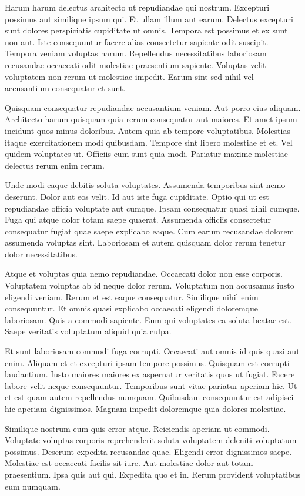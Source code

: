 Harum harum delectus architecto ut repudiandae qui nostrum. Excepturi possimus aut similique ipsum qui. Et ullam illum aut earum. Delectus excepturi sunt dolores perspiciatis cupiditate ut omnis. Tempora est possimus et ex sunt non aut. Iste consequuntur facere alias consectetur sapiente odit suscipit. Tempora veniam voluptas harum. Repellendus necessitatibus laboriosam recusandae occaecati odit molestiae praesentium sapiente. Voluptas velit voluptatem non rerum ut molestiae impedit. Earum sint sed nihil vel accusantium consequatur et sunt.

Quisquam consequatur repudiandae accusantium veniam. Aut porro eius aliquam. Architecto harum quisquam quia rerum consequatur aut maiores. Et amet ipsum incidunt quos minus doloribus. Autem quia ab tempore voluptatibus. Molestias itaque exercitationem modi quibusdam. Tempore sint libero molestiae et et. Vel quidem voluptates ut. Officiis eum sunt quia modi. Pariatur maxime molestiae delectus rerum enim rerum.

Unde modi eaque debitis soluta voluptates. Assumenda temporibus sint nemo deserunt. Dolor aut eos velit. Id aut iste fuga cupiditate. Optio qui ut est repudiandae officia voluptate aut cumque. Ipsam consequatur quasi nihil cumque. Fuga qui atque dolor totam saepe quaerat. Assumenda officiis consectetur consequatur fugiat quae saepe explicabo eaque. Cum earum recusandae dolorem assumenda voluptas sint. Laboriosam et autem quisquam dolor rerum tenetur dolor necessitatibus.

Atque et voluptas quia nemo repudiandae. Occaecati dolor non esse corporis. Voluptatem voluptas ab id neque dolor rerum. Voluptatum non accusamus iusto eligendi veniam. Rerum et est eaque consequatur. Similique nihil enim consequuntur. Et omnis quasi explicabo occaecati eligendi doloremque laboriosam. Quis a commodi sapiente. Eum qui voluptates ea soluta beatae est. Saepe veritatis voluptatum aliquid quia culpa.

Et sunt laboriosam commodi fuga corrupti. Occaecati aut omnis id quis quasi aut enim. Aliquam et et excepturi ipsam tempore possimus. Quisquam est corrupti laudantium. Iusto maiores maiores ex aspernatur veritatis quos ut fugiat. Facere labore velit neque consequuntur. Temporibus sunt vitae pariatur aperiam hic. Ut et est quam autem repellendus numquam. Quibusdam consequuntur est adipisci hic aperiam dignissimos. Magnam impedit doloremque quia dolores molestiae.

Similique nostrum eum quis error atque. Reiciendis aperiam ut commodi. Voluptate voluptas corporis reprehenderit soluta voluptatem deleniti voluptatum possimus. Deserunt expedita recusandae quae. Eligendi error dignissimos saepe. Molestiae est occaecati facilis sit iure. Aut molestiae dolor aut totam praesentium. Ipsa quis aut qui. Expedita quo et in. Rerum provident voluptatibus eum numquam.

